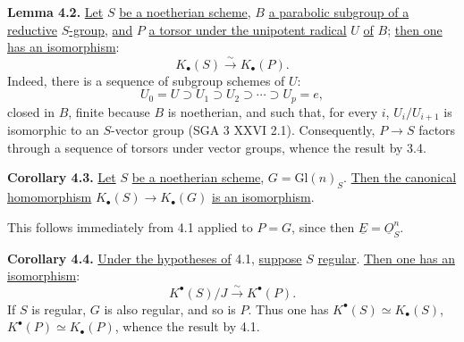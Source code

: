 \textbf{Lemma 4.2.} \uline{Let} $S$ \uline{be a noetherian scheme}, $B$ \uline{a parabolic subgroup of a reductive} $S$\uline{-group}, \uline{and} $P$ \uline{a torsor under the unipotent radical} $U$ \uline{of} $B$; \uline{then one has an isomorphism}:
\[
K_\bullet(S)\xrightarrow{\sim}K_\bullet(P).
\]
Indeed, there is a sequence of subgroup schemes of $U$:
\[
U_0=U\supset U_1\supset U_2\supset\cdots\supset U_p=e,
\]
closed in $B$, finite because $B$ is noetherian, and such that, for every $i$, $U_i/U_{i+1}$ is isomorphic to an $S$-vector group (SGA 3 XXVI 2.1). Consequently, $P\to S$ factors through a sequence of torsors under vector groups, whence the result by 3.4.

\textbf{Corollary 4.3.} \uline{Let} $S$ \uline{be a noetherian scheme}, $G=\mathrm{Gl}(n)_S$. \uline{Then the canonical homomorphism} $K_\bullet(S)\longrightarrow K_\bullet(G)$ \uline{is an isomorphism}.

This follows immediately from 4.1 applied to $P=G$, since then $\underline{E}=\underline{O}_S^n$.


%

\textbf{Corollary 4.4.} \uline{Under the hypotheses of} 4.1, \uline{suppose} $S$ \uline{regular}. \uline{Then one has an isomorphism}:
\[
K^{\bullet}(S)/J\xrightarrow{\sim}K^{\bullet}(P).
\]
If $S$ is regular, $G$ is also regular, and so is $P$. Thus one has $K^{\bullet}(S)\simeq K_\bullet(S)$, $K^{\bullet}(P)\simeq K_\bullet(P)$, whence the result by 4.1.

\clearpage


